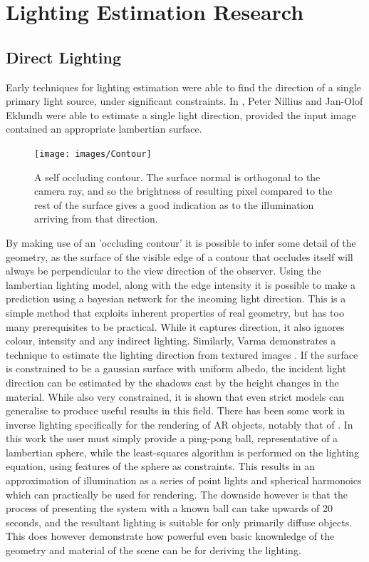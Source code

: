 \documentclass[ %
                    author={Gavin Parker},
                supervisor={Dr. Neill Campbell},
                    degree={MEng},
                     title={Deep Siamese Networks for Illumination Estimation from Stereo Images},
                  subtitle={},
                      type={research},
                      year={2018} ]{dissertation}
\begin{document}
\section{Lighting Estimation Research}
\subsection{Direct Lighting}
Early techniques for lighting estimation were able to find the direction of a single primary light source, under significant constraints. In \cite{990650}, Peter Nillius and Jan-Olof Eklundh were able to estimate a single light direction, provided the input image contained an appropriate lambertian surface.
\begin{figure}
\texttt{[image: images/Contour]}
\centering
\caption{A self occluding contour. The surface normal is orthogonal to the camera ray, and so the brightness of resulting pixel compared to the rest of the surface gives a good indication as to the illumination arriving from that direction.}
\end{figure}
By making use of an 'occluding contour' it is possible to infer some detail of the geometry, as the surface of the visible edge of a contour that occludes itself will always be perpendicular to the view direction of the observer. Using the lambertian lighting model, along with the edge intensity it is possible to make a prediction using a bayesian network for the incoming light direction. This is a simple method that exploits inherent properties of real geometry, but has too many prerequisites to be practical. While it captures direction, it also ignores colour, intensity and any indirect lighting. Similarly, Varma demonstrates a technique to estimate the lighting direction from textured images \cite{1315030}. If the surface is constrained to be a gaussian surface with uniform albedo, the incident light direction can be estimated by the shadows cast by the height changes in the material. While also very constrained, it is shown that even strict models can generalise to produce useful results in this field.
\newline
There has been some work in inverse lighting specifically for the rendering of AR objects, notably that of \cite{Aittala2010}. In this work the user must simply provide a ping-pong ball, representative of a lambertian sphere, while the least-squares algorithm is performed on the lighting equation, using features of the sphere as constraints. This results in an approximation of illumination as a series of point lights and spherical harmonoics which can practically be used for rendering. The downside however is that the process of presenting the system with a known ball can take upwards of 20 seconds, and the resultant lighting is suitable for only primarily diffuse objects. This does however demonstrate how powerful even basic knownledge of the geometry and material of the scene can be for deriving the lighting.
\end{document}
